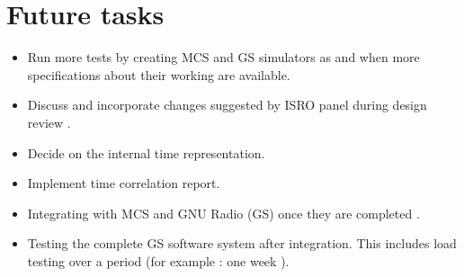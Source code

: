 \documentclass[BTech]{iitmdiss}
\begin{document}
\section{Future tasks}
\begin{itemize}

\item Run more tests by creating MCS and GS simulators as and when more specifications about their working are available.
\item Discuss and incorporate changes suggested by ISRO panel during design review .
\item Decide on the internal time representation.
\item Implement time correlation report.
\item Integrating with MCS and GNU Radio (GS) once they are completed .
\item Testing the complete GS software system after integration. This includes load testing over a period (for example : one week ).
\end{itemize}

\appendix
 
\end{document}
